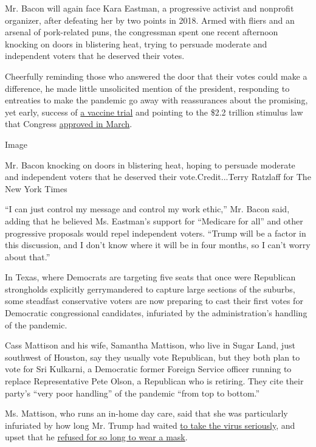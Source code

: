 Mr. Bacon will again face Kara Eastman, a progressive activist and
nonprofit organizer, after defeating her by two points in 2018. Armed
with fliers and an arsenal of pork-related puns, the congressman spent
one recent afternoon knocking on doors in blistering heat, trying to
persuade moderate and independent voters that he deserved their votes.

Cheerfully reminding those who answered the door that their votes could
make a difference, he made little unsolicited mention of the president,
responding to entreaties to make the pandemic go away with reassurances
about the promising, yet early, success of
\href{https://www.nytimes3xbfgragh.onion/2020/07/14/health/cornavirus-vaccine-moderna.html}{a
vaccine trial} and pointing to the \$2.2 trillion stimulus law that
Congress
\href{https://www.nytimes3xbfgragh.onion/2020/03/27/us/politics/coronavirus-house-voting.html}{approved
in March}.

Image

Mr. Bacon knocking on doors in blistering heat, hoping to persuade
moderate and independent voters that he deserved their
vote.Credit...Terry Ratzlaff for The New York Times

``I can just control my message and control my work ethic,'' Mr. Bacon
said, adding that he believed Ms. Eastman's support for ``Medicare for
all'' and other progressive proposals would repel independent voters.
``Trump will be a factor in this discussion, and I don't know where it
will be in four months, so I can't worry about that.''

In Texas, where Democrats are targeting five seats that once were
Republican strongholds explicitly gerrymandered to capture large
sections of the suburbs, some steadfast conservative voters are now
preparing to cast their first votes for Democratic congressional
candidates, infuriated by the administration's handling of the pandemic.

Cass Mattison and his wife, Samantha Mattison, who live in Sugar Land,
just southwest of Houston, say they usually vote Republican, but they
both plan to vote for Sri Kulkarni, a Democratic former Foreign Service
officer running to replace Representative Pete Olson, a Republican who
is retiring. They cite their party's ``very poor handling'' of the
pandemic ``from top to bottom.''

Ms. Mattison, who runs an in-home day care, said that she was
particularly infuriated by how long Mr. Trump had waited
\href{https://www.nytimes3xbfgragh.onion/interactive/2020/us/texas-coronavirus-cases.html}{to
take the virus seriously}, and upset that he
\href{https://www.nytimes3xbfgragh.onion/2020/07/01/us/coronavirus-masks.html}{refused
for so long to wear a mask}.

